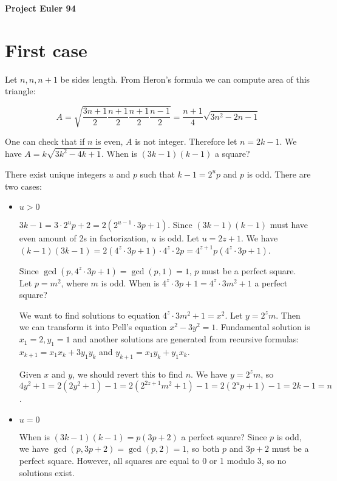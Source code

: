 \documentclass[a4paper,12pt]{article}
\begin{document}
\setlength\parindent{0pt}
\textbf{Project Euler 94}
\vspace{5ex}


\section*{First case}

Let \(n, n, n + 1\) be sides length.
From Heron's formula we can compute area of this triangle:

\[A = \sqrt{\frac{3n + 1}{2} \frac{n + 1}{2}
\frac{n + 1}{2} \frac{n - 1}{2}} = \frac{n + 1}{4} \sqrt{3n^2 - 2n - 1}\]

One can check that if \(n\) is even, \(A\) is not integer.
Therefore let \(n = 2k - 1\). We have
\(A = k \sqrt{3k^2 - 4k + 1}\). When is \((3k - 1)(k - 1)\) a square?

There exist unique integers \(u\) and \(p\) such that \(k - 1 = 2^up\) and
\(p\) is odd. There are two cases:
\begin{itemize}
\item \(u > 0\)

\(3k - 1 = 3 \cdot 2^up + 2 = 2(2^{u - 1} \cdot 3p + 1)\).
Since \((3k - 1)(k - 1)\) must have even amount of 2s in factorization,
\(u\) is odd. Let \(u = 2z + 1\). We have \((k - 1)(3k - 1) =
2(4^z \cdot 3p + 1) \cdot 4^z \cdot 2p = 4^{z + 1} p(4^z \cdot 3p + 1)\).

Since \(\gcd(p, 4^z \cdot 3p + 1) = \gcd(p, 1) = 1\),
\(p\) must be a perfect square. Let \(p = m^2\), where \(m\) is odd.
When is \(4^z \cdot 3p + 1 = 4^z \cdot 3m^2 + 1\) a perfect square?

We want to find solutions to equation \(4^z \cdot 3m^2 + 1 = x^2\).
Let \(y = 2^zm\). Then we can transform it into Pell's equation
\(x^2 - 3y^2 = 1\). Fundamental solution is \(x_1 = 2, y_1 = 1\)
and another solutions are generated from recursive formulas:
\(x_{k + 1} = x_1x_k + 3y_1y_k\) and \(y_{k + 1} = x_1y_k + y_1x_k\).

Given \(x\) and \(y\), we should revert this to find \(n\).
We have \(y = 2^zm\), so \(4y^2 + 1 = 2(2y^2 + 1) - 1 =
2(2^{2z + 1}m^2 + 1) - 1 = 2(2^up + 1) - 1 = 2k - 1 = n\).

\item \(u = 0\)

When is \((3k - 1)(k - 1) = p(3p + 2)\) a perfect square?
Since \(p\) is odd, we have \(\gcd(p, 3p + 2) = \gcd(p, 2) = 1\),
so both \(p\) and \(3p + 2\) must be a perfect square.
However, all squares are equal to 0 or 1 modulo 3, so no solutions exist.

\end{itemize}
\end{document}
